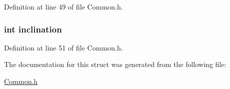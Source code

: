 Definition at line 49 of file Common.\+h.

\hypertarget{struct_tracking_data_af308b9934394c8bcf7614eb1df2d863f}{
\subsubsection[{inclination}]{\setlength{\rightskip}{0pt plus 5cm}int inclination}}\label{struct_tracking_data_af308b9934394c8bcf7614eb1df2d863f}


Definition at line 51 of file Common.\+h.



The documentation for this struct was generated from the following file\+:\begin{DoxyCompactItemize}
\item 
\hyperlink{_common_8h}{Common.\+h}\end{DoxyCompactItemize}
